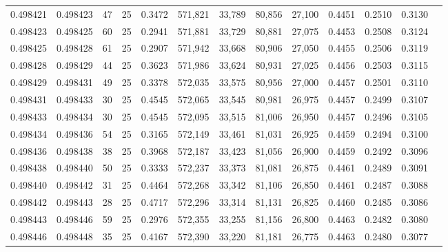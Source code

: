 \begin{tabular}{rrrrrrrrrrrrr}
0.498421 & 0.498423 &    47 &  25 &                                     0.3472 & 571,821 &  33,789 &  80,856 &  27,100 & 0.4451 & 0.2510 & 0.3130 \\
0.498423 & 0.498425 &    60 &  25 &                                     0.2941 & 571,881 &  33,729 &  80,881 &  27,075 & 0.4453 & 0.2508 & 0.3124 \\
0.498425 & 0.498428 &    61 &  25 &                                     0.2907 & 571,942 &  33,668 &  80,906 &  27,050 & 0.4455 & 0.2506 & 0.3119 \\
0.498428 & 0.498429 &    44 &  25 &                                     0.3623 & 571,986 &  33,624 &  80,931 &  27,025 & 0.4456 & 0.2503 & 0.3115 \\
0.498429 & 0.498431 &    49 &  25 &                                     0.3378 & 572,035 &  33,575 &  80,956 &  27,000 & 0.4457 & 0.2501 & 0.3110 \\
0.498431 & 0.498433 &    30 &  25 &                                     0.4545 & 572,065 &  33,545 &  80,981 &  26,975 & 0.4457 & 0.2499 & 0.3107 \\
0.498433 & 0.498434 &    30 &  25 &                                     0.4545 & 572,095 &  33,515 &  81,006 &  26,950 & 0.4457 & 0.2496 & 0.3105 \\
0.498434 & 0.498436 &    54 &  25 &                                     0.3165 & 572,149 &  33,461 &  81,031 &  26,925 & 0.4459 & 0.2494 & 0.3100 \\
0.498436 & 0.498438 &    38 &  25 &                                     0.3968 & 572,187 &  33,423 &  81,056 &  26,900 & 0.4459 & 0.2492 & 0.3096 \\
0.498438 & 0.498440 &    50 &  25 &                                     0.3333 & 572,237 &  33,373 &  81,081 &  26,875 & 0.4461 & 0.2489 & 0.3091 \\
0.498440 & 0.498442 &    31 &  25 &                                     0.4464 & 572,268 &  33,342 &  81,106 &  26,850 & 0.4461 & 0.2487 & 0.3088 \\
0.498442 & 0.498443 &    28 &  25 &                                     0.4717 & 572,296 &  33,314 &  81,131 &  26,825 & 0.4460 & 0.2485 & 0.3086 \\
0.498443 & 0.498446 &    59 &  25 &                                     0.2976 & 572,355 &  33,255 &  81,156 &  26,800 & 0.4463 & 0.2482 & 0.3080 \\
0.498446 & 0.498448 &    35 &  25 &                                     0.4167 & 572,390 &  33,220 &  81,181 &  26,775 & 0.4463 & 0.2480 & 0.3077 \\

\end{tabular}
